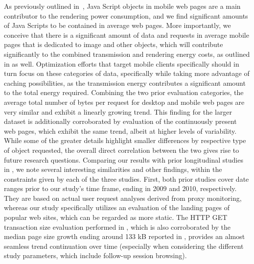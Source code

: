 As previously outlined in~\cite{ThAgNiBoSi12}, Java Script objects in mobile web pages are a main contributor to the rendering power consumption, and we find significant amounts of Java Scripts to be contained in average web pages.
More importantly, we conceive that there is a significant amount of data and requests in average mobile pages that is dedicated to image and other objects, which will contribute significantly to the combined transmission and rendering energy costs, as outlined in \cite{ThAgNiBoSi12} as well.
Optimization efforts that target mobile clients specifically should in turn focus on these categories of data, specifically while taking more advantage of caching possibilities, as the transmission energy contributes a significant amount to the total energy required.
%
%
Combining the two prior evaluation categories, the average total number of bytes per request for desktop and mobile web pages are very similar and exhibit a linearly growing trend.
This finding for the larger dataset is additionally corroborated by evaluation of the continuously present web pages, which exhibit the same trend, albeit at higher levels of variability.
While some of the greater details highlight smaller differences by respective type of object requested, the overall direct correlation between the two gives rise to future research questions.
%
%
Comparing our results with prior longitudinal studies in \cite{CaAlPa10,IhPa11}, we note several interesting similarities and other findings, within the constraints given by each of the three studies.
First, both prior studies cover date ranges prior to our study's time frame, ending in 2009 and 2010, respectively. They are based on actual user request analyses derived from proxy monitoring, whereas our study specifically utilizes an evaluation of the landing pages of popular web sites, which can be regarded as more static.
The HTTP GET transaction size evaluation performed in \cite{CaAlPa10}, which is also corroborated by the median page size growth ending around 133 kB reported in \cite{IhPa11}, provides an almost seamless trend continuation over time (especially when considering the different study parameters, which include follow-up session browsing).

